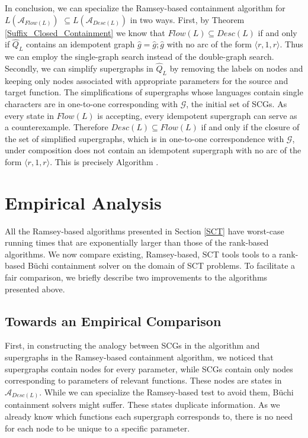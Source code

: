 \documentclass{LMCS}
\newcommand{\zug}[1]{\langle #1  \rangle}
\newcommand\buchi{B\"uchi }
\newcommand{\A}{{\mathcal A}}
\newcommand{\G}{{\mathcal G}}
\newcommand{\superg}{\widehat}
\newcommand{\supergFD}{\superg{Q}_L}
\begin{document}
In conclusion, we can specialize the Ramsey-based containment algorithm
for\linebreak[1]
$L(\A_{Flow(L)})$ $\subseteq L(\A_{Desc(L)})$ in two ways.  First, by Theorem
\ref{Suffix_Closed_Containment} we know that $Flow(L) \subseteq Desc(L)$ if and
only if $\supergFD$ contains an idempotent graph
$\superg{g}=\superg{g};\superg{g}$ with no arc of the form $\zug{r,1,r}$. Thus
we can employ the single-graph search instead of the double-graph search.
Secondly, we can simplify supergraphs in $\supergFD$ by removing the labels on
nodes and keeping only nodes associated with appropriate parameters for the
source and target function.  The simplifications of supergraphs whose languages
contain single characters are in one-to-one corresponding with $\G$, the initial
set of SCGs.  As every state in $Flow(L)$ is accepting, every idempotent
supergraph can serve as a counterexample. Therefore $Desc(L) \subseteq Flow(L)$
if and only if the closure of the set of simplified supergraphs, which is in
one-to-one correspondence with $\G$, under composition does not contain an
idempotent supergraph with no arc of the form $\zug{r,1,r}$. This is precisely
Algorithm \LJB.

\section{Empirical Analysis}\label{Sect:Exps}
All the Ramsey-based algorithms presented in Section \ref{SCT} have worst-case
running times that are exponentially larger than those of the rank-based
algorithms. We now compare existing, Ramsey-based, SCT tools tools to a
rank-based \buchi containment solver on the domain of SCT problems.  To
facilitate a fair comparison, we briefly describe two improvements to the
algorithms presented above.  

\subsection{Towards an Empirical Comparison}\label{Sect:Prep}

First, in constructing the analogy between SCGs in the \LJB algorithm and
supergraphs in the Ramsey-based containment algorithm, we noticed that
supergraphs contain nodes for every parameter, while SCGs contain only
nodes corresponding to parameters of relevant functions.  These nodes are
states in $\A_{Desc(L)}$. While we can specialize the Ramsey-based test to avoid
them, \buchi containment solvers might suffer. These states duplicate
information. As we already know which functions each supergraph corresponds to,
there is no need for each node to be unique to a specific parameter.
\end{document}
